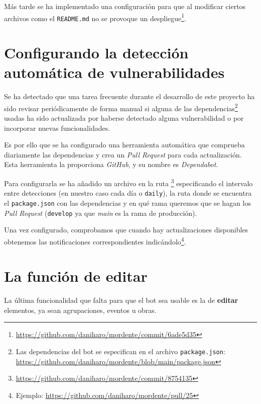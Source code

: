 Más tarde se ha implementado una configuración para que al modificar ciertos archivos como el \texttt{README.md} no se provoque un despliegue\footnote{\url{https://github.com/daniharo/mordente/commit/6ade5d35}}.


\section{Configurando la detección automática de vulnerabilidades}


Se ha detectado que una tarea frecuente durante el desarrollo de este proyecto ha sido revisar periódicamente de forma manual si alguna de las dependencias\footnote{Las dependencias del bot se especifican en el archivo \texttt{package.json}: \url{https://github.com/daniharo/mordente/blob/main/package.json}} usadas ha sido actualizada por haberse detectado alguna vulnerabilidad o por incorporar nuevas funcionalidades.

Es por ello que se ha configurado una herramienta automática que comprueba diariamente las dependencias y crea un \textit{Pull Request} para cada actualización. Esta herramienta la proporciona \textit{GitHub}, y su nombre es \textit{Dependabot}.

Para configurarla se ha añadido un archivo en la ruta \footnote{\url{https://github.com/daniharo/mordente/commit/8754135}} especificando el intervalo entre detecciones (en nuestro caso cada día o \texttt{daily}), la ruta donde se encuentra el \texttt{package.json} con las dependencias y en qué rama queremos que se hagan los \textit{Pull Request} (\texttt{develop} ya que \textit{main} es la rama de producción).

Una vez configurado, comprobamos que cuando hay actualizaciones disponibles obtenemos las notificaciones correspondientes indicándolo\footnote{Ejemplo: \url{https://github.com/daniharo/mordente/pull/25}}.

\section{La función de editar}

La última funcionalidad que falta para que el bot sea usable es la de \textbf{editar} elementos, ya sean agrupaciones, eventos u obras. 

